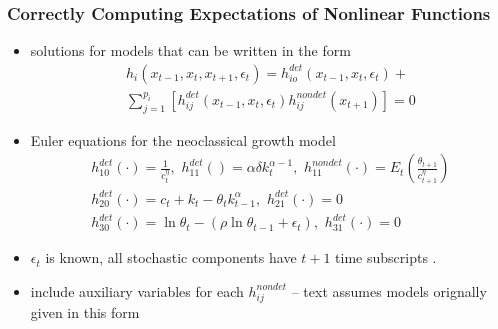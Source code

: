 \documentclass[letter]{beamer}
\begin{document}
\begin{frame}
  \frametitle{Correctly Computing Expectations of Nonlinear Functions}
{\small 
  \begin{itemize}
  \item solutions for models that can be written in  the form
\begin{gather}
  h_i(x_{t-1},x_{t},x_{t+1},\epsilon_t)=h^{det}_{io}(x_{t-1},x_{t},\epsilon_t)+\\ 
\sum_{j=1}^{p_i} [h^{det}_{ij}(x_{t-1},x_{t},\epsilon_t)h^{nondet}_{ij}(x_{t+1})]=0
\end{gather}
\item Euler equations for the  neoclassical growth  model 
\label{sec:simple-rbc-model-ext} 
\begin{gather}
h_{10}^{det}(\cdot)=\frac{1}{c_t^\eta},\,\,
h_{11}^{det}()=\alpha \delta k_{t}^{\alpha-1} ,\,\,
h_{11}^{nondet}(\cdot)=E_t \left (\frac{\theta_{t+1}}{c_{t+1}^\eta} \right )\\
h_{20}^{det}(\cdot)=c_t + k_t-\theta_tk_{t-1}^\alpha,\,\,
h_{21}^{det}(\cdot)=0\\
h_{30}^{det}(\cdot)=\ln \theta_t -(\rho \ln \theta_{t-1} + \epsilon_t),\,\,
h_{31}^{det}(\cdot)=0
\end{gather}
\item $\epsilon_t$ is known, all stochastic components have $t+1$ time subscripts . 
\item include auxiliary variables for each $h_{ij}^{nondet}$  -- text assumes models orignally given in this form
  \end{itemize}




}
\end{frame}
\end{document}
